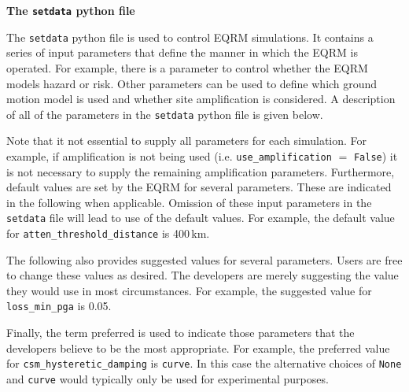 \documentclass[a4paper, 12pt]{report}
\begin{document}
\newcommand{\indexfunc}[1]{\index{#1@\texttt{#1}}\index{function!#1@\texttt{#1}}}
\newcommand{\typepar}[3]{\linebreak[2]\texttt{#1}\-\texttt{#2}\-\texttt{#3}}
\newcommand{\typeself}[3]{\linebreak[2]\texttt{#1}\-\texttt{#2}\-\texttt{#3}\index{#1#2#3@\texttt{#1#2#3}}}
\newcommand{\indexpar}[1]{\index{#1@\texttt{#1}}\index{setdata parameter@ \texttt{setdata} parameter!#1@\texttt{#1}}}
\newcommand{\typefunc}[3]{\linebreak[2]\texttt{#1}\-\texttt{#2}\-\texttt{#3}\indexfunc{#1#2#3}}

\newcommand{\manual}[1]{Manual: #1}

\LARGE \noindent \textbf{The \texttt{setdata} python file}

\vspace{1em} \normalsize The \texttt{setdata} python file is used to
control EQRM simulations. It contains a series of input parameters
that define the manner in which the EQRM is operated. For example,
there is a parameter to control whether the EQRM models hazard or
risk. Other parameters can be used to define which ground motion
model is used and whether site amplification is considered. A
description of all of the parameters in the
 \texttt{setdata} python file is given below.

\vspace{1em} Note that it not essential to supply all parameters for
each simulation. For example, if amplification is not being used
(i.e. \texttt{use\_amplification} $=$ \texttt{False}) it is not
necessary to supply the remaining amplification parameters.
Furthermore, default values are set by the EQRM for several
parameters. These are indicated in the following when applicable.
Omission of these input parameters in the \texttt{setdata} file will
lead to use of the default values. For example, the default value
for \texttt{atten\_threshold\_distance} is 400\,km.

\vspace{1em} The following also provides suggested values for
several parameters. Users are free to change these values as
desired. The developers are merely suggesting the value they would
use in most circumstances. For example, the suggested value for
\texttt{loss\_min\_pga} is 0.05.

\vspace{1em}
Finally, the term preferred is used to indicate those parameters that the developers believe to
be the most appropriate. For example, the preferred value for \typepar{csm\_}{hysteretic\_}{damping}
is \texttt{curve}. In this case the alternative choices of \texttt{None} and \texttt{curve}
would typically only be used for experimental purposes.
\end{document}
